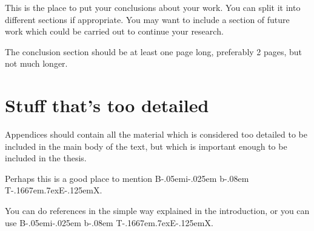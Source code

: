 \documentclass[12pt,a4paper]{report}
\def\BibTeX{{\rm B\kern-.05em{\sc i\kern-.025em b}\kern-.08em
    T\kern-.1667em\lower.7ex\hbox{E}\kern-.125emX}}
\begin{document}
This is the place to put your conclusions about your work. You can
split it into different sections if appropriate. You may want to include
a section of future work which could be carried out to continue your
research.

The conclusion section should be at least one page long, preferably 2
pages, but not much longer.

\appendix

\chapter{Stuff that's too detailed}

Appendices should contain all the material which is considered too
detailed to be included in the main body of the text, but which is
important enough to be included in the thesis.

Perhaps this is a good place to mention \BibTeX.

You can do references in the simple way explained in the introduction,
or you can use \BibTeX.




\end{document}
